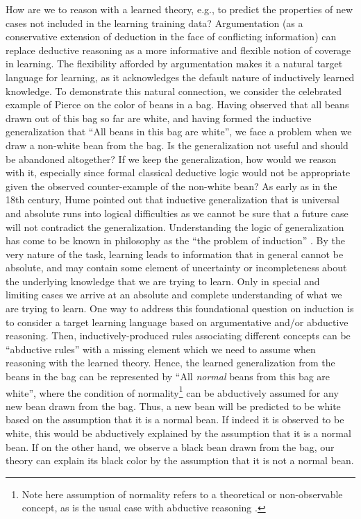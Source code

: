 How are we to reason with a learned theory, e.g., to predict the properties of new cases not included in the learning training data? Argumentation (as a conservative extension of deduction in the face of conflicting information) can replace deductive reasoning as a more informative and flexible notion of coverage in learning. The flexibility afforded by argumentation makes it a natural target language for learning, as it acknowledges the default nature of inductively learned knowledge. To demonstrate this natural connection, we consider the celebrated example of Pierce  on the color of beans in a bag. Having observed that all beans drawn out of this bag so far are white, and having formed the inductive generalization that ``All beans in this bag are white'', we face a problem when we draw a non-white bean from the bag. Is the generalization not useful and should be abandoned altogether? If we keep the generalization, how would we reason with it, especially since formal classical deductive logic would not be appropriate given the observed counter-example of the non-white bean?
As early as in the 18th century, Hume  pointed out that inductive generalization that is universal and absolute runs into logical difficulties as we cannot be sure that a future case will not contradict the generalization. Understanding the logic of generalization has come to be known in philosophy as the ``the problem of induction'' . By the very nature of the task, learning leads to information that in general cannot be absolute, and may contain some element of uncertainty or incompleteness about the underlying knowledge that we are trying to learn. Only in special and limiting cases we arrive at an absolute and complete understanding of what we are trying to learn. 
One way to address this foundational question on induction is to consider a target learning language based on argumentative and/or abductive reasoning. Then, inductively-produced rules associating different concepts can be ``abductive rules'' with a missing element which we need to assume when reasoning with the learned theory. Hence, the learned generalization from the beans in the bag can be represented by ``All \emph{normal} beans from this bag are white'', where the condition of normality\footnote{Note here assumption of normality refers to a theoretical or non-observable concept, as is the usual case with abductive reasoning .} can be abductively assumed for any new bean drawn from the bag. Thus, a new bean will be predicted to be white based on the assumption that it is a normal bean. If indeed it is observed to be white, this would be abductively explained by the assumption that it is a normal bean. If on the other hand, we observe a black bean drawn from the bag, our theory can explain its black color by the assumption that it is not a normal bean.
